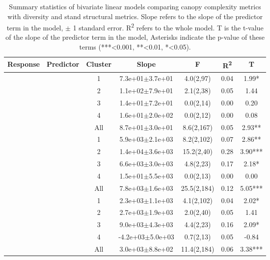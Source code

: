 \setlength{\tabcolsep}{4pt}
\begin{longtable}{llccccS[table-format=-2.2, table-space-text-post = {***}]}
\caption{Summary statistics of bivariate linear models comparing canopy complexity metrics with diversity and stand structural metrics. Slope refers to the slope of the predictor term in the model, $\pm{}$ 1 standard error. R\textsuperscript{2} refers to the whole model. T is the t-value of the slope of the predictor term in the model, Asterisks indicate the p-value of these terms (***<0.001, **<0.01, *<0.05).} \\ 
  \toprule
{Response} & {Predictor} & {Cluster} & {Slope} & {F} & {R\textsuperscript{2}} & {T} \\ 
  \midrule
{} & {} & 1 &  7.3e+01$\pm$3.7e+01 & 4.0(2,97) & 0.04 & 1.99* \\ 
   &  & 2 &  1.1e+02$\pm$7.9e+01 & 2.1(2,38) & 0.05 & 1.44 \\ 
   &  & 3 &  1.4e+01$\pm$7.2e+01 & 0.0(2,14) & 0.00 & 0.20 \\ 
   &  & 4 &  1.6e+01$\pm$2.0e+02 & 0.0(2,12) & 0.00 & 0.08 \\ 
   &  & All &  8.7e+01$\pm$3.0e+01 & 8.6(2,167) & 0.05 & 2.93** \\ 
   \midrule
{} & {} & 1 &  5.9e+03$\pm$2.1e+03 & 8.2(2,102) & 0.07 & 2.86** \\ 
   &  & 2 &  1.4e+04$\pm$3.6e+03 & 15.2(2,40) & 0.28 & 3.90*** \\ 
   &  & 3 &  6.6e+03$\pm$3.0e+03 & 4.8(2,23) & 0.17 & 2.18* \\ 
   &  & 4 &  1.5e+01$\pm$5.5e+03 & 0.0(2,13) & 0.00 & 0.00 \\ 
   &  & All &  7.8e+03$\pm$1.6e+03 & 25.5(2,184) & 0.12 & 5.05*** \\ 
   \midrule
{} & {} & 1 &  2.3e+03$\pm$1.1e+03 & 4.1(2,102) & 0.04 & 2.02* \\ 
   &  & 2 &  2.7e+03$\pm$1.9e+03 & 2.0(2,40) & 0.05 & 1.41 \\ 
   &  & 3 &  9.0e+03$\pm$4.3e+03 & 4.4(2,23) & 0.16 & 2.09* \\ 
   &  & 4 & -4.2e+03$\pm$5.0e+03 & 0.7(2,13) & 0.05 & -0.84 \\ 
   &  & All &  3.0e+03$\pm$8.8e+02 & 11.4(2,184) & 0.06 & 3.38*** \\ 

\end{longtable}
